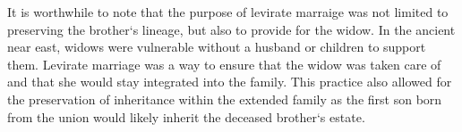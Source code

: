 \vspace{2\baselineskip}

\begin{fullwidth}
It is worthwhile to note that the purpose of levirate marraige was not limited to preserving the brother`s lineage, but also to provide for the widow. In the ancient
near east, widows were vulnerable without a husband or children to support them. Levirate marriage was a way to ensure that the widow was taken care of and that 
she would stay integrated into the family. This practice also allowed for the preservation of inheritance within the extended family as the first son born from the union would
likely inherit the deceased brother`s estate. 
\end{fullwidth}
